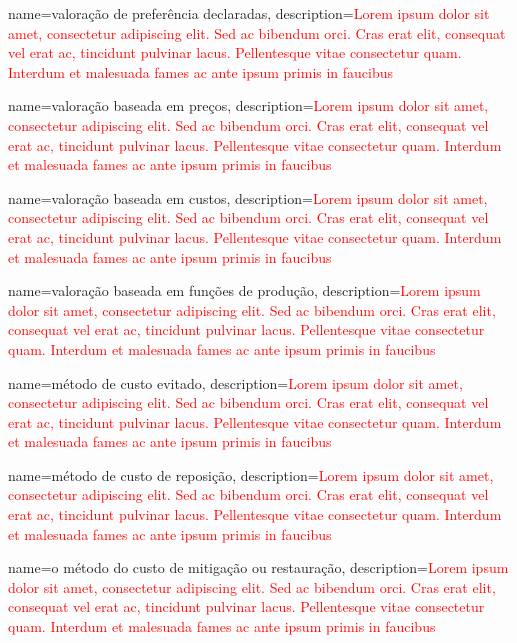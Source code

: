 {
	name=valoração de preferência declaradas,
	description={\textcolor{red}{Lorem ipsum dolor sit amet, consectetur adipiscing elit. Sed ac bibendum orci. Cras erat elit, consequat vel erat ac, tincidunt pulvinar lacus. Pellentesque vitae consectetur quam. Interdum et malesuada fames ac ante ipsum primis in faucibus}}
}

{
	name=valoração baseada em preços,
	description={\textcolor{red}{Lorem ipsum dolor sit amet, consectetur adipiscing elit. Sed ac bibendum orci. Cras erat elit, consequat vel erat ac, tincidunt pulvinar lacus. Pellentesque vitae consectetur quam. Interdum et malesuada fames ac ante ipsum primis in faucibus}}
}

{
	name=valoração baseada em custos,
	description={\textcolor{red}{Lorem ipsum dolor sit amet, consectetur adipiscing elit. Sed ac bibendum orci. Cras erat elit, consequat vel erat ac, tincidunt pulvinar lacus. Pellentesque vitae consectetur quam. Interdum et malesuada fames ac ante ipsum primis in faucibus}}
}

{
	name=valoração baseada em funções de produção,
	description={\textcolor{red}{Lorem ipsum dolor sit amet, consectetur adipiscing elit. Sed ac bibendum orci. Cras erat elit, consequat vel erat ac, tincidunt pulvinar lacus. Pellentesque vitae consectetur quam. Interdum et malesuada fames ac ante ipsum primis in faucibus}}
}

{
	name=método de custo evitado,
	description={\textcolor{red}{Lorem ipsum dolor sit amet, consectetur adipiscing elit. Sed ac bibendum orci. Cras erat elit, consequat vel erat ac, tincidunt pulvinar lacus. Pellentesque vitae consectetur quam. Interdum et malesuada fames ac ante ipsum primis in faucibus}}
}

{
	name=método de custo de reposição,
	description={\textcolor{red}{Lorem ipsum dolor sit amet, consectetur adipiscing elit. Sed ac bibendum orci. Cras erat elit, consequat vel erat ac, tincidunt pulvinar lacus. Pellentesque vitae consectetur quam. Interdum et malesuada fames ac ante ipsum primis in faucibus}}
}

{
	name=o método do custo de mitigação ou restauração,
	description={\textcolor{red}{Lorem ipsum dolor sit amet, consectetur adipiscing elit. Sed ac bibendum orci. Cras erat elit, consequat vel erat ac, tincidunt pulvinar lacus. Pellentesque vitae consectetur quam. Interdum et malesuada fames ac ante ipsum primis in faucibus}}
}

